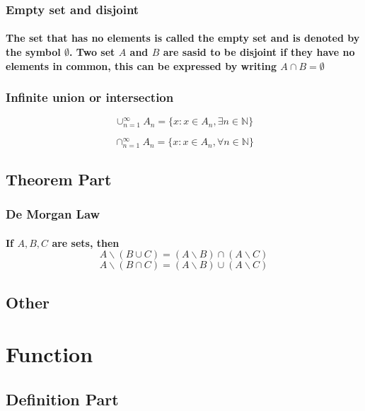 \documentclass{article}
\begin{document}
            \subsubsection{Empty set and disjoint}
                \paragraph{
                    The set that has no elements is called the \textbf{empty set} and is denoted by the symbol  $\emptyset$. Two set $A$ and $B$ are sasid to be \textbf{disjoint} if they have no elements in common, this can be expressed by writing $A \cap B =\emptyset$
                }
                
            
            \subsubsection{Infinite union or intersection}

                $$\cup _{n=1} ^{\infty} A_n=\{x:x\in A_n ,\exists n \in \mathbb{N} \}$$

                $$\cap _{n=1} ^{\infty} A_n=\{x:x\in A_n ,\forall n \in \mathbb{N} \}$$
                
        \subsection{Theorem Part}
            \subsubsection{De Morgan Law}
                \paragraph{If $A,B,C$ are sets, then
                $$A \backslash (B\cup C) = (A\backslash B)\cap (A\backslash C)$$
                $$A\backslash (B\cap C) = (A\backslash B)\cup (A\backslash C)$$}
            

        \subsection{Other}

    \section{Function}
        \subsection{Definition Part}
\end{document}
